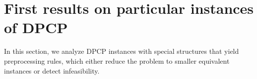 \documentclass[preprint, 11pt, authoryear]{elsarticle}
\newcommand{\PP}{{\mathcal P}}
\newcommand{\card}[1]{\left| #1 \right|}
\newcommand{\cn}[1]{\chi(#1)}
\begin{document}





\section{First results on particular  instances of DPCP} \label{sec:feasibility:DPCP}

 In this section, we analyze DPCP instances with special structures that yield preprocessing rules, which either reduce the problem to smaller equivalent instances or detect infeasibility.
\end{document}
